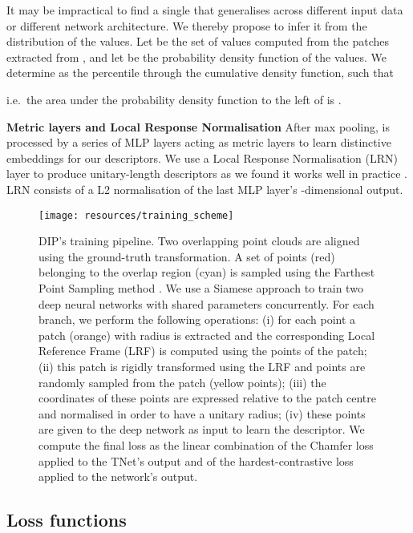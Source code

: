 \documentclass[a4paper,conference]{IEEEtran}
\begin{document}
It may be impractical to find a single  that generalises across different input data or different network architecture.
We thereby propose to infer it from the distribution of the  values.
Let  be the set of  values computed from the patches extracted from , and let  be the probability density function of the  values.
We determine  as the  percentile through the cumulative density function, such that

i.e.~the area under the probability density function  to the left of  is .


\vspace{1mm}
\noindent \textbf{Metric layers and Local Response Normalisation} 
After max pooling,  is processed by a series of MLP layers acting as metric layers to learn distinctive embeddings for our descriptors.
We use a Local Response Normalisation (LRN) layer to produce unitary-length descriptors as we found it works well in practice \cite{Tian2017,Gojcic2019,Choy2019}. 
LRN consists of a L2 normalisation of the last MLP layer's -dimensional output.

\begin{figure*}[t]
  \centering
  \texttt{[image: resources/training\_scheme]}
  \vspace{-6mm}
  \caption{DIP's training pipeline.
  Two overlapping point clouds are aligned using the ground-truth transformation.
  A set of  points (red) belonging to the overlap region (cyan) is sampled using the Farthest Point Sampling method \cite{Qi2017b}.
  We use a Siamese approach to train two deep neural networks with shared parameters concurrently.
  For each branch, we perform the following operations:
  (i) for each point a patch (orange) with radius  is extracted and the corresponding Local Reference Frame (LRF) \cite{Gojcic2019} is computed using the points of the patch;
  (ii) this patch is rigidly transformed using the LRF and  points are randomly sampled from the patch (yellow points);
  (iii) the coordinates of these  points are expressed relative to the patch centre and normalised in order to have a unitary radius;
  (iv) these  points are given to the deep network as input to learn the descriptor.
  We compute the final loss as the linear combination of the Chamfer loss \cite{Zhao2019} applied to the TNet's output and of the hardest-contrastive loss \cite{Choy2019} applied to the network's output.}
  \label{fig:training_block_diagram}
\end{figure*}


\subsection{Loss functions}\label{sec:loss_functions}
\end{document}
